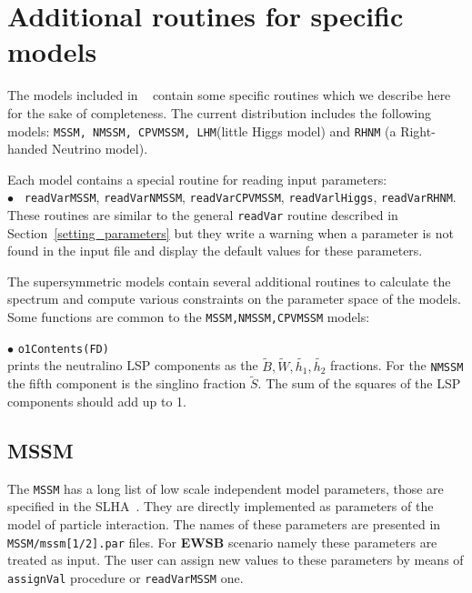 \documentclass[12pt,a4paper]{article}
\begin{document}
\section{Additional routines for specific models}
The models included in \micro~ contain some specific routines
which we describe here for the sake of completeness. The current 
distribution includes the following models: {\tt MSSM, NMSSM, CPVMSSM, LHM}(little Higgs model)
and {\tt RHNM} (a Right-handed Neutrino model).

Each model contains a special routine for reading input parameters:\\
$\bullet$ \verb| readVarMSSM|, \verb|readVarNMSSM|,  \verb|readVarCPVMSSM|,
\verb|readVarlHiggs|, \verb|readVarRHNM|.\\
 These routines  are similar to the general 
\verb|readVar| routine described  in Section~\ref{setting_parameters}
but  they write a warning when a parameter is not found in the 
input file and display the default values for these parameters.

The supersymmetric models contain several additional routines to calculate the spectrum
and compute various constraints on the parameter space of the models. Some functions are
common to the \verb|MSSM,NMSSM,CPVMSSM| models: 


\noindent
$\bullet$  \verb|o1Contents(FD)|\\
prints  the neutralino LSP components as the  $\tilde{B},\tilde{W},
\tilde{h_1},\tilde{h_2}$ fractions. For the {\tt NMSSM} the fifth component is
the singlino fraction  $\tilde{S}$. The sum of the squares of the LSP components
should add up to 1. 



\subsection{MSSM}
The {\tt MSSM} has a long list of low scale  independent model 
parameters, those are specified in the SLHA~\cite{Skands:2003cj,Allanach:2008qq}.
They are directly implemented as parameters of the model of particle interaction.
The names of these parameters are presented in  {\tt MSSM/mssm[1/2].par} files.
For {\bf EWSB} scenario namely these parameters are treated as input.
The user  can assign new values to these parameters by means of {\tt assignVal}
procedure or {\tt readVarMSSM} one.
\end{document}

